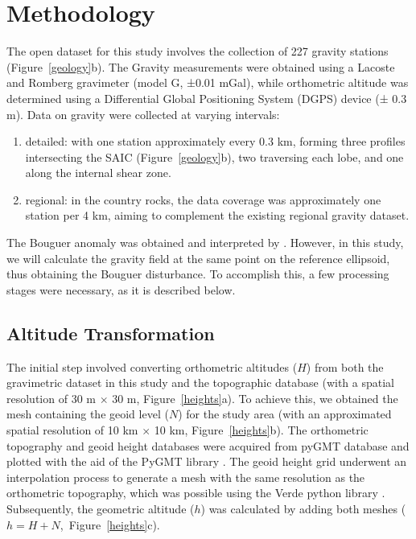 \section{Methodology}

The open dataset for this study involves the collection of 227 gravity stations (Figure~\ref{geology}b). The Gravity measurements were obtained using a Lacoste and Romberg gravimeter (model G, ±0.01 mGal), while orthometric altitude was determined using a Differential Global Positioning System (DGPS) device (± 0.3 m). Data on gravity were collected at varying intervals: 

\begin{enumerate}[label=(\roman*)]
    \item detailed: with one station approximately every 0.3 km, forming three profiles intersecting the SAIC (Figure~\ref{geology}b), two traversing each lobe, and one along the internal shear zone.
    \item regional: in the country rocks, the data coverage was approximately one station per 4 km, aiming to complement the existing regional gravity dataset.
\end{enumerate}


The Bouguer anomaly was obtained and interpreted by \citet{Souza-Junior2021}. However, in this study, we will calculate the gravity field at the same point on the reference ellipsoid, thus obtaining the Bouguer disturbance. To accomplish this, a few processing stages were necessary, as it is described below.

\subsection{Altitude Transformation}\label{altitude}

The initial step involved converting orthometric altitudes ($H$) from both the gravimetric dataset in this study and the topographic database (with a spatial resolution of 30 m $\times$ 30 m, Figure~\ref{heights}a). To achieve this, we obtained the mesh containing the geoid level ($N$) for the study area (with an approximated spatial resolution of 10 km $\times$ 10 km, Figure~\ref{heights}b). The orthometric topography and geoid height databases were acquired from pyGMT database \citep{gmt} and plotted with the aid of the PyGMT library \citep{pygmt}. The geoid height grid underwent an interpolation process to generate a mesh with the same resolution as the orthometric topography, which was possible using the Verde python library \citep{verde2018}. Subsequently, the geometric altitude ($h$) was calculated by adding both meshes ($h = H + N$,~Figure~\ref{heights}c).

